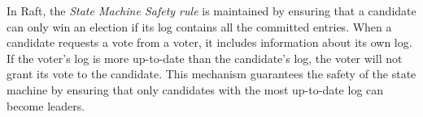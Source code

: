 In Raft, the \textit{State Machine Safety rule} is maintained by ensuring that a candidate can only win an election if its log contains all the committed entries. When a candidate requests a vote from a voter, it includes information about its own log. If the voter's log is more up-to-date than the candidate's log, the voter will not grant its vote to the candidate. This mechanism guarantees the safety of the state machine by ensuring that only candidates with the most up-to-date log can become leaders.

\newpage